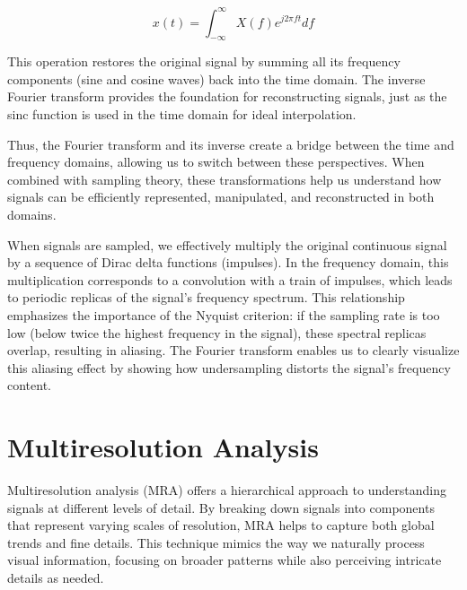 \[
x(t) = \int_{-\infty}^{\infty} X(f) e^{j2\pi ft} df
\]

This operation restores the original signal by summing all its frequency components (sine and cosine waves) back into the time domain. The inverse Fourier transform provides the foundation for reconstructing signals, just as the sinc function is used in the time domain for ideal interpolation.

Thus, the Fourier transform and its inverse create a bridge between the time and frequency domains, allowing us to switch between these perspectives. When combined with sampling theory, these transformations help us understand how signals can be efficiently represented, manipulated, and reconstructed in both domains.

When signals are sampled, we effectively multiply the original continuous signal by a sequence of Dirac delta functions (impulses). In the frequency domain, this multiplication corresponds to a convolution with a train of impulses, which leads to periodic replicas of the signal's frequency spectrum. This relationship emphasizes the importance of the Nyquist criterion: if the sampling rate is too low (below twice the highest frequency in the signal), these spectral replicas overlap, resulting in aliasing. The Fourier transform enables us to clearly visualize this aliasing effect by showing how undersampling distorts the signal’s frequency content.




\section{Multiresolution Analysis}

Multiresolution analysis (MRA) offers a hierarchical approach to understanding signals at different levels of detail. By breaking down signals into components that represent varying scales of resolution, MRA helps to capture both global trends and fine details. This technique mimics the way we naturally process visual information, focusing on broader patterns while also perceiving intricate details as needed.

